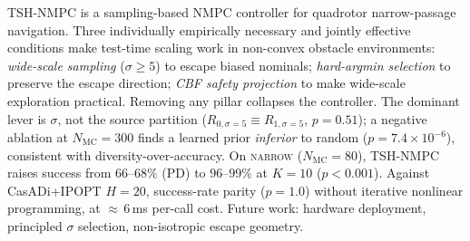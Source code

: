 \documentclass[11pt,onecolumn,a4paper]{article}
\newcommand{\Nm}{N_{\mathrm{MC}}}
\begin{document}
TSH-NMPC is a sampling-based NMPC controller for quadrotor
narrow-passage navigation. Three individually empirically necessary
and jointly effective conditions make test-time scaling work in
non-convex obstacle environments: \emph{wide-scale sampling}
($\sigma \ge 5$) to escape biased nominals; \emph{hard-argmin selection}
to preserve the escape direction; \emph{CBF safety projection} to make
wide-scale exploration practical. Removing any pillar collapses the
controller. The dominant lever is $\sigma$, not the source partition
($R_{0,\sigma=5} \equiv R_{1,\sigma=5}$, $p = 0.51$); a negative
ablation at $\Nm = 300$ finds a learned prior \emph{inferior} to
random ($p = 7.4 \times 10^{-6}$), consistent with
diversity-over-accuracy. On \textsc{narrow} ($\Nm = 80$), TSH-NMPC
raises success from $66$--$68\%$ (PD) to $96$--$99\%$ at $K = 10$
($p < 0.001$). Against CasADi+IPOPT $H = 20$, success-rate parity
($p = 1.0$) without iterative nonlinear programming, at
${\approx}\,6\,$ms per-call cost. Future work: hardware deployment,
principled $\sigma$ selection, non-isotropic escape geometry.
\end{document}
